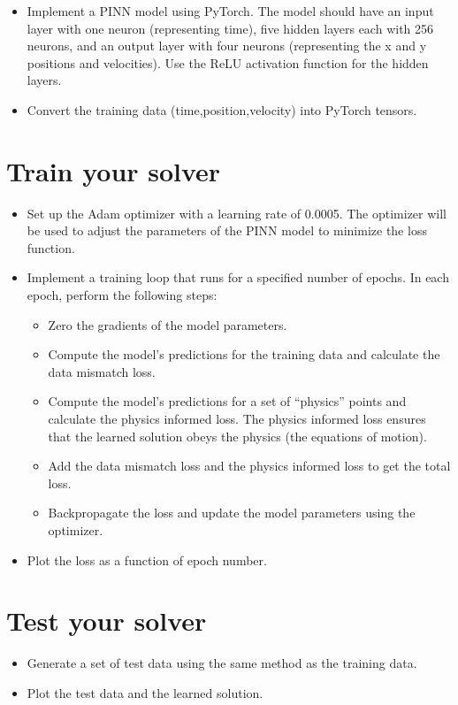 \documentclass{article}
\begin{document}
\begin{itemize}
    \item Implement a PINN model using PyTorch. The model should have an input layer with one neuron (representing time), five hidden layers each with 256 neurons, and an output layer with four neurons (representing the x and y positions and velocities). Use the ReLU activation function for the hidden layers.
    \item Convert the training data (time,position,velocity) into PyTorch tensors.
\end{itemize}

\section{Train your solver}
\begin{itemize}
    \item Set up the Adam optimizer with a learning rate of 0.0005. The optimizer will be used to adjust the parameters of the PINN model to minimize the loss function.
    \item Implement a training loop that runs for a specified number of epochs. In each epoch, perform the following steps:\begin{itemize}
        \item Zero the gradients of the model parameters.
        \item Compute the model’s predictions for the training data and calculate the data mismatch loss.
        \item Compute the model’s predictions for a set of “physics” points and calculate the physics informed loss. The physics informed loss ensures that the learned solution obeys the physics (the equations of motion).
        \item Add the data mismatch loss and the physics informed loss to get the total loss.
        \item Backpropagate the loss and update the model parameters using the optimizer.
    \end{itemize}
    \item Plot the loss as a function of epoch number.
\end{itemize}

\section{Test your solver}
\begin{itemize}
    \item Generate a set of test data using the same method as the training data.
    \item Plot the test data and the learned solution.
\end{itemize}
\end{document}
